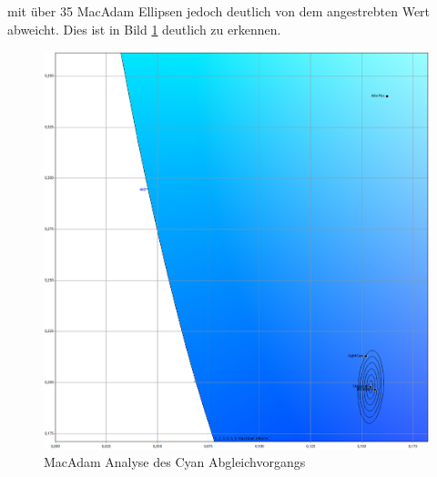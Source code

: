 \documentclass[11pt]{scrartcl}
\begin{document}
mit über 35 MacAdam Ellipsen jedoch deutlich von dem angestrebten Wert abweicht. Dies ist in Bild \ref{fig:macAdamCyan}
deutlich zu erkennen.
\begin{figure}[H]
    \begin{center}
        \includegraphics[width=.9\textwidth]{images/macAdam/comparedCyan_mix.png}
    \end{center}
    \caption{MacAdam Analyse des Cyan Abgleichvorgangs} \label{fig:macAdamCyan}
\end{figure}
\end{document}
